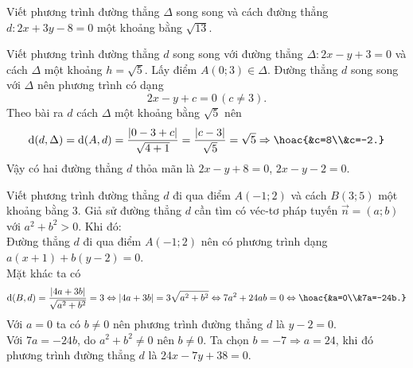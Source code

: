 	\begin{bt}%
		Viết phương trình đường thẳng $\Delta$ song song và cách đường thẳng $d\colon 2x+3y-8=0$ một khoảng bằng $\sqrt{13}$.
	\end{bt}
	\begin{bt}%
		Viết phương trình đường thẳng $d$ song song với đường thẳng $\Delta\colon 2x-y+3=0$ và cách $\Delta$ một khoảng $h=\sqrt{5}$.
		\loigiai
		{Lấy điểm $A(0;3)\in \Delta$. Đường thẳng $d$ song song với $\Delta$ nên phương trình có dạng
			$$2x-y+c=0 \, (c\neq 3).$$
			Theo bài ra $d$ cách $\Delta$ một khoảng bằng $\sqrt{5}$ nên
			$$\mathrm{d}(d,\Delta)=\mathrm{d}(A,d)=\dfrac{\left|0-3+c\right|}{\sqrt{4+1}}=\dfrac{\left|c-3\right|}{\sqrt{5}}=\sqrt{5} \Rightarrow \hoac{&c=8\\&c=-2.}$$
			Vậy có hai đường thẳng $d$ thỏa mãn là $2x-y+8=0$, $2x-y-2=0$.}
	\end{bt}
	\begin{bt}%
		Viết phương trình đường thẳng $d$ đi qua điểm $A(-1;2)$ và cách $B(3;5)$ một khoảng bằng $3$.
		\loigiai
		{Giả sử đường thẳng $d$ cần tìm có véc-tơ pháp tuyến $\overrightarrow{n}=(a;b)$ với $a^2+b^2>0$. Khi đó:\\
			Đường thẳng $d$ đi qua điểm $A(-1;2)$ nên có phương trình dạng $a(x+1)+b(y-2)=0$.\\
			Mặt khác ta có 
			$$\mathrm{d}(B,d)=\dfrac{\left|4a+3b\right|}{\sqrt{a^2+b^2}}=3 \Leftrightarrow |4a+3b|=3\sqrt{a^2+b^2} \Leftrightarrow 7a^2+24ab=0 \Leftrightarrow \hoac{&a=0\\&7a=-24b.}$$
			Với $a=0$ ta có $b\neq 0$ nên phương trình đường thẳng $d$ là $y-2=0$.\\
			Với $7a=-24b$, do $a^2+b^2\neq 0$ nên $b\neq 0$. Ta chọn $b=-7 \Rightarrow a=24$, khi đó phương trình đường thẳng $d$ là $24x-7y+38=0$.}
	\end{bt}

